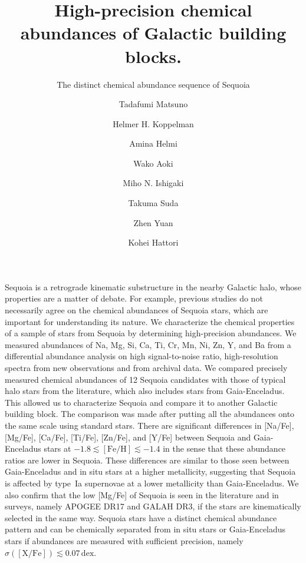 \documentclass{aa}
\begin{document}
\title{High-precision chemical abundances of Galactic building blocks.}
\subtitle{The distinct chemical abundance sequence of Sequoia}
\author{Tadafumi Matsuno  
\and 
Helmer H. Koppelman 
\and 
Amina Helmi 
\and
Wako Aoki 
\and
Miho N. Ishigaki 
\and
Takuma Suda 
\and
Zhen Yuan 
\and
Kohei Hattori 
}



\abstract
  {
Sequoia is a retrograde kinematic substructure in the nearby Galactic halo, whose properties are a matter of debate.
For example, previous studies do not necessarily agree on the chemical abundances of Sequoia stars, which are important for understanding its nature.
  } %
  {
  We characterize the chemical properties of a sample of stars from Sequoia by determining high-precision abundances. 
  } %
  {
  We measured abundances of Na, Mg, Si, Ca, Ti, Cr, Mn, Ni, Zn, Y, and Ba from a differential abundance analysis on high signal-to-noise ratio, high-resolution spectra from new observations and from archival data. 
  We compared precisely measured chemical abundances of 12 Sequoia candidates with those of typical halo stars from the literature, which also includes stars from Gaia-Enceladus.
  This allowed us to characterize Sequoia and compare it to another Galactic building block.
  The comparison was made after putting all the abundances onto the same scale using standard stars.
  } %
  {
  There are significant differences in [{Na}/{Fe}], [{Mg}/{Fe}], [{Ca}/{Fe}], [{Ti}/{Fe}], [{Zn}/{Fe}], and [{Y}/{Fe}] between Sequoia and Gaia-Enceladus stars at $-1.8\lesssim [\mathrm{Fe/H}]\lesssim -1.4$ in the sense that these abundance ratios are lower in Sequoia.
  These differences are similar to those seen between Gaia-Enceladus and in situ stars at a higher metallicity, suggesting that Sequoia is affected by type~Ia supernovae at a lower metallicity than Gaia-Enceladus.
  We also confirm that the low [{Mg}/{Fe}] of Sequoia is seen in the literature and in surveys, namely APOGEE DR17 and GALAH DR3, if the stars are kinematically selected in the same way. 
  } %
  {
  Sequoia stars have a distinct chemical abundance pattern and can be chemically separated from in situ stars or Gaia-Enceladus stars if abundances are measured with sufficient precision, namely $\sigma([\mathrm{X/Fe}])\lesssim 0.07\,\mathrm{dex}$.
  } %
\maketitle
\end{document}
